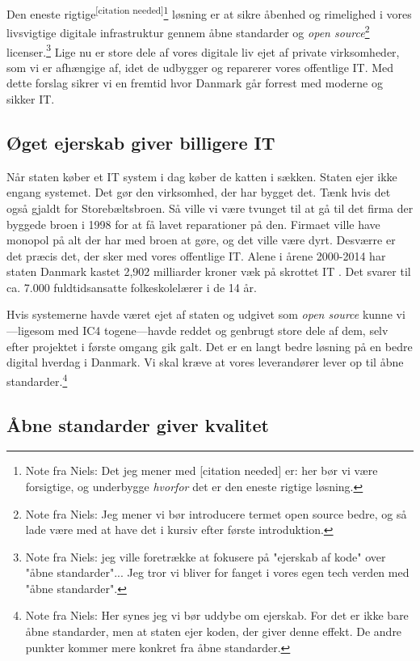 \documentclass[fleqn]{article}
\begin{document}
Den eneste rigtige\textsuperscript{[citation needed]}\footnote{Note fra Niels: Det jeg mener med [citation needed] er: her bør vi være forsigtige, og underbygge \emph{hvorfor} det er den eneste rigtige løsning.} løsning er at sikre åbenhed og rimelighed i vores livsvigtige digitale infrastruktur gennem åbne standarder og \textit{open source}\footnote{Note fra Niels: Jeg mener vi bør introducere termet open source bedre, og så lade være med at have det i kursiv efter første introduktion.} licenser.\footnote{Note fra Niels: jeg ville foretrække at fokusere på "ejerskab af kode" over "åbne standarder"... Jeg tror vi bliver for fanget i vores egen tech verden med "åbne standarder".}
Lige nu er store dele af vores digitale liv ejet af private virksomheder, som vi er afhængige af, idet de udbygger og reparerer vores offentlige IT.
Med dette forslag sikrer vi en fremtid hvor Danmark går forrest med moderne og sikker IT.

\subsection{Øget ejerskab giver billigere IT}

Når staten køber et IT system i dag køber de katten i sækken. Staten ejer ikke engang
systemet. Det gør den virksomhed, der har bygget det. Tænk hvis det også gjaldt for
Storebæltsbroen. Så ville vi være tvunget til at gå til det firma der byggede
broen i 1998 for at få lavet reparationer på den. Firmaet ville have monopol på alt
der har med broen at gøre, og det ville være dyrt.
Desværre er det præcis det, der sker med vores offentlige IT. Alene i årene 
2000-2014 har staten Danmark kastet 2,902 milliarder kroner væk på skrottet IT
\cite{dr8}. Det svarer til ca. 7.000 fuldtidsansatte folkeskolelærer i de 14 år.

Hvis systemerne havde været ejet af staten og udgivet som \textit{open source} kunne
vi---ligesom med IC4 togene---havde reddet og genbrugt store dele af dem, selv efter
projektet i første omgang gik galt.
Det er en langt bedre løsning på en bedre digital hverdag i Danmark. Vi skal kræve
at vores leverandører lever op til åbne standarder.\footnote{Note fra Niels: Her
synes jeg vi bør uddybe om ejerskab. For det er ikke bare åbne standarder, men
at staten ejer koden, der giver denne effekt. De andre punkter kommer mere konkret
fra åbne standarder.}

\subsection{Åbne standarder giver kvalitet}
\end{document}
